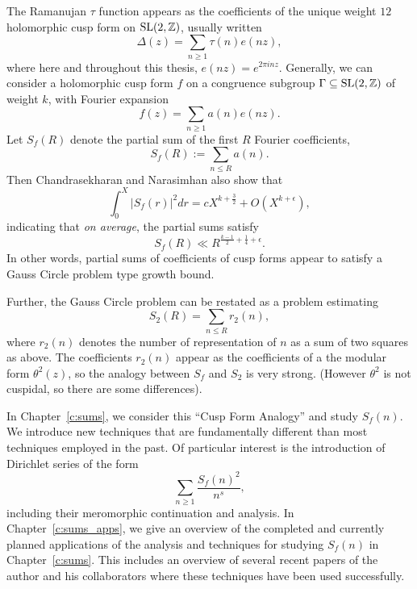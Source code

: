 The Ramanujan $\tau$ function appears as the coefficients of the unique weight $12$
holomorphic cusp form on $\operatorname{SL}(2, \mathbb{Z})$, usually written
\begin{equation}
  \Delta(z) = \sum_{n \geq 1} \tau(n) e(nz),
\end{equation}
where here and throughout this thesis, $e(nz) = e^{2\pi i n z}$.
Generally, we can consider a holomorphic cusp form $f$ on a congruence subgroup $\Gamma
\subseteq \operatorname{SL}(2, \mathbb{Z})$ of weight $k$, with Fourier expansion
\begin{equation}
  f(z) = \sum_{n \geq 1} a(n) e(nz).
\end{equation}
Let $S_f(R)$ denote the partial sum of the first $R$ Fourier coefficients,
\begin{equation}
  S_f(R) := \sum_{n \leq R} a(n).
\end{equation}
Then Chandrasekharan and Narasimhan also show that
\begin{equation}
  \int_0^X \lvert S_f(r) \rvert^2 dr = c X^{k + \frac{3}{2}} + O(X^{k + \epsilon}),
\end{equation}
indicating that \emph{on average}, the partial sums satisfy
\begin{equation}
  S_f(R) \ll R^{\frac{k-1}{2} + \frac{1}{4} + \epsilon}.
\end{equation}
In other words, partial sums of coefficients of cusp forms appear to satisfy a Gauss
Circle problem type growth bound.





Further, the Gauss Circle problem can be restated as a problem estimating
\begin{equation}
  S_2(R) = \sum_{n \leq R} r_2(n),
\end{equation}
where $r_2(n)$ denotes the number of representation of $n$ as a sum of two squares as
above.
The coefficients $r_2(n)$ appear as the coefficients of a the modular form $\theta^2(z)$,
so the analogy between $S_f$ and $S_2$ is very strong.
(However $\theta^2$ is not cuspidal, so there are some differences).



In Chapter~\ref{c:sums}, we consider this ``Cusp Form Analogy'' and study $S_f(n)$.
We introduce new techniques that are fundamentally different than most techniques employed
in the past.
Of particular interest is the introduction of Dirichlet series of the form
\begin{equation}
  \sum_{n \geq 1} \frac{S_f(n)^2}{n^s},
\end{equation}
including their meromorphic continuation and analysis.
In Chapter~\ref{c:sums_apps}, we give an overview of the completed and currently planned
applications of the analysis and techniques for studying $S_f(n)$ in Chapter~\ref{c:sums}.
This includes an overview of several recent papers of the author and his collaborators
where these techniques have been used successfully.






